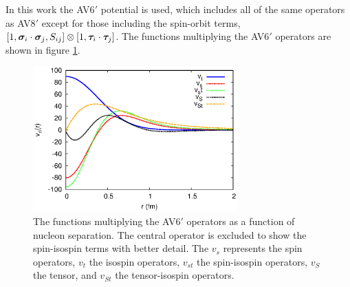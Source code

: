 In this work the AV6$'$ potential is used, which includes all of the same operators as AV8$'$ except for those including the spin-orbit terms, $\left[1,\bm{\sigma}_i\cdot\bm{\sigma}_j,S_{ij}\right]\otimes\left[1,\bm{\tau}_i\cdot\bm{\tau}_j\right]$. The functions multiplying the AV6$'$ operators are shown in figure \ref{fig:vij}.
\begin{figure}[h!]
   \centering
   \includegraphics[width=0.7\textwidth]{figures/vij.eps}
   \caption{The functions multiplying the AV6$'$ operators as a function of nucleon separation. The central operator is excluded to show the spin-isospin terms with better detail. The $v_s$ represents the spin operators, $v_t$ the isospin operators, $v_{st}$ the spin-isospin operators, $v_S$ the tensor, and $v_{St}$ the tensor-isospin operators.}
   \label{fig:vij}
\end{figure}

